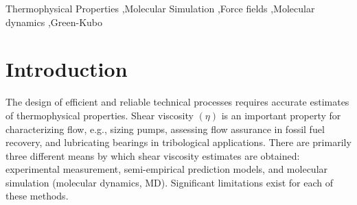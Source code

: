 \documentclass[preprint,review,12pt]{elsarticle}
\begin{document}
\begin{frontmatter}
\begin{abstract}
		\end{abstract}
		
		\begin{keyword}
			
			
			
			Thermophysical Properties \sep Molecular Simulation \sep Force fields \sep Molecular dynamics \sep Green-Kubo
			
		\end{keyword}
		
	\end{frontmatter}	
	
%	
%	
%	
%	
%	
	
	\section{Introduction}
	
	The design of efficient and reliable technical processes requires accurate estimates of thermophysical properties. Shear viscosity $(\eta)$ is an important property for characterizing flow, e.g., sizing pumps, assessing flow assurance in fossil fuel recovery, and lubricating bearings in tribological applications. There are primarily three different means by which shear viscosity estimates are obtained: experimental measurement, semi-empirical prediction models, and molecular simulation (molecular dynamics, MD). Significant limitations exist for each of these methods. 
	
\end{document}

